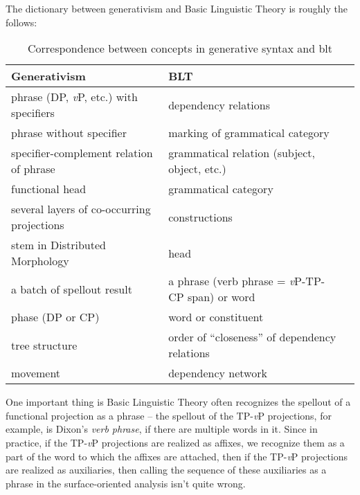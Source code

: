 \documentclass[UTF8, a4paper, oneside, scheme=plain]{ctexrep}
\newcommand*{\term}[1]{\emph{#1}}
\newcommand{\vP}{\textit{v}P}
\begin{document}
The dictionary between generativism and Basic Linguistic Theory is roughly the follows:
\begin{table}[H]
    \caption*{Correspondence between concepts in generative syntax and \acs{blt}}
    \centering
    \begin{tabular}{@{}lll@{}}
    \toprule
    Generativism                               & BLT                                          \\ \midrule
    phrase (DP, \vP, etc.) with specifiers     & dependency relations                          \\
    phrase without specifier                   & marking of grammatical category               \\
    specifier-complement relation of phrase    & grammatical relation (subject, object, etc.)  \\
    functional head                            & grammatical category                          \\
    several layers of co-occurring projections & constructions                                 \\
    stem in Distributed Morphology             & head                                          \\
    a batch of spellout result                 & a phrase (verb phrase = \vP-TP-CP span) or word    \\
    phase (DP or CP)                           & word or constituent                           \\
    tree structure                             & order of ``closeness'' of dependency relations  \\
    movement                                   & dependency network                            \\ \bottomrule
    \end{tabular}
\end{table}

One important thing is Basic Linguistic Theory often recognizes 
the spellout of a functional projection 
as a phrase -- 
the spellout of the TP-\vP{} projections, 
for example, is Dixon's \term{verb phrase}, 
if there are multiple words in it.
Since in practice, if the TP-\vP{} projections are realized as affixes, 
we recognize them as a part of the word to which the affixes are attached,
then if the TP-\vP{} projections are realized as auxiliaries,
then calling the sequence of these auxiliaries as a phrase in the surface-oriented analysis 
isn't quite wrong.
\end{document}
